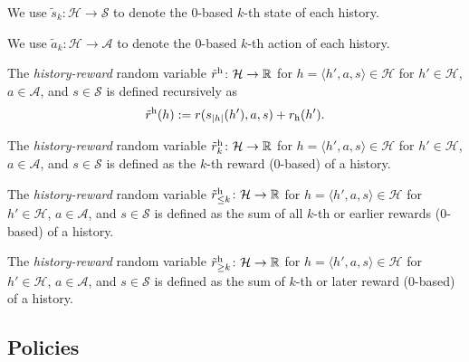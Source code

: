 \begin{definition}
  We use $\tilde{s}_k\colon \mathcal{H} \to \mathcal{S}$ to denote the 0-based $k$-th state of each history.
\end{definition}

\begin{definition}
  We use $\tilde{a}_k\colon \mathcal{H} \to \mathcal{A}$ to denote the 0-based $k$-th action of each history.
\end{definition}

\begin{definition} \label{def:reward}
The \emph{history-reward} random variable $\tilde{r}^{\mathrm{h}}\colon \mathcal{H} \to \mathbb{R}$ for $h = \langle h', a, s \rangle \in  \mathcal{H}$ for $h'\in \mathcal{H}$, $a\in \mathcal{A}$, and $s\in \mathcal{S}$ is defined recursively as
\[
\tilde{r}^{\mathrm{h}}(h) := r(s_{|h|}(h'), a, s) + r_{\mathrm{h}}(h').
\]
\end{definition}

\begin{definition}\label{reward_at}
The \emph{history-reward} random variable $\tilde{r}^{\mathrm{h}}_k \colon \mathcal{H} \to \mathbb{R}$ for $h = \langle h', a, s \rangle \in  \mathcal{H}$ for $h'\in \mathcal{H}$, $a\in \mathcal{A}$, and $s\in \mathcal{S}$ is defined as the $k$-th reward (0-based) of a history.
\end{definition}

\begin{definition}\label{reward_to}
The \emph{history-reward} random variable $\tilde{r}^{\mathrm{h}}_{\le k} \colon \mathcal{H} \to \mathbb{R}$ for $h = \langle h', a, s \rangle \in  \mathcal{H}$ for $h'\in \mathcal{H}$, $a\in \mathcal{A}$, and $s\in \mathcal{S}$ is defined as the sum of all $k$-th or earlier rewards (0-based) of a history.
\end{definition}

\begin{definition}\label{reward_from}
The \emph{history-reward} random variable $\tilde{r}^{\mathrm{h}}_{\ge k}\colon \mathcal{H} \to \mathbb{R}$ for $h = \langle h', a, s \rangle \in  \mathcal{H}$ for $h'\in \mathcal{H}$, $a\in \mathcal{A}$, and $s\in \mathcal{S}$ is defined as the sum of $k$-th or later reward (0-based) of a history.
\end{definition}

\subsection{Policies}

